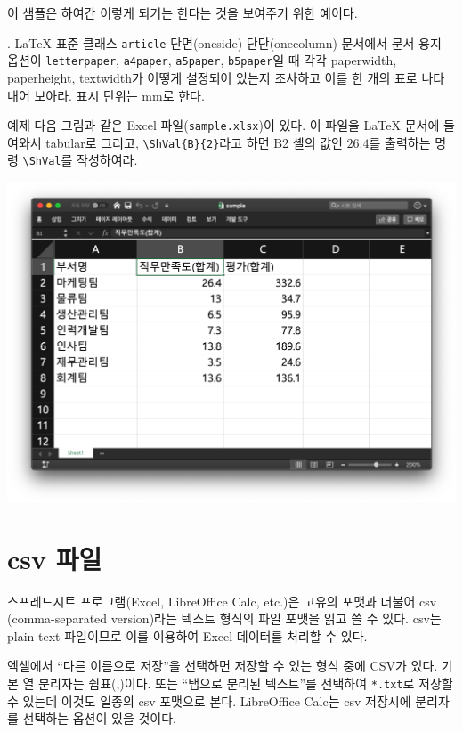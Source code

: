 이 샘플은 하여간 이렇게 되기는 한다는 것을 보여주기 위한 예이다.


\vfill

\begin{questionp}
 \bangotsuite.
\LaTeX{} 표준 클래스 \verb|article| 단면(oneside) 단단(onecolumn) 문서에서
문서 용지 옵션이 \verb|letterpaper|, \verb|a4paper|, \verb|a5paper|, \verb|b5paper|일 때
각각 paperwidth, paperheight, textwidth가 어떻게 설정되어 있는지
조사하고 이를 한 개의 표로 나타내어 보아라. 표시 단위는 mm로 한다.
\end{questionp}

\newpage

\begin{questiona}{예제}
다음 그림과 같은 Excel 파일(\verb|sample.xlsx|)이 있다. 이 파일을 \LaTeX{} 문서에
들여와서 tabular로 그리고, \verb|\ShVal{B}{2}|라고 하면 B2 셸의 값인 $26.4$를
출력하는 명령 \verb|\ShVal|를 작성하여라.
\begin{center}
\includegraphics[scale=.33]{screenshot-excel}
\end{center}
\end{questiona}

\section{csv 파일}

스프레드시트 프로그램(Excel, LibreOffice Calc, etc.)은 고유의 포맷과 더불어 
csv (comma-separated version)라는 텍스트 형식의 파일 포맷을 읽고 쓸 수 있다.
csv는 plain text 파일이므로 이를 이용하여 Excel 데이터를 처리할 수 있다.

엑셀에서 “다른 이름으로 저장”을 선택하면 저장할 수 있는 형식 중에 CSV가 있다. 
기본 열 분리자는 쉼표(,)이다.
또는 “탭으로 분리된 텍스트”를 선택하여 \verb|*.txt|로 저장할 수 있는데 이것도 일종의
csv 포맷으로 본다. 
LibreOffice Calc는 csv 저장시에 분리자를 선택하는 옵션이 있을 것이다.

